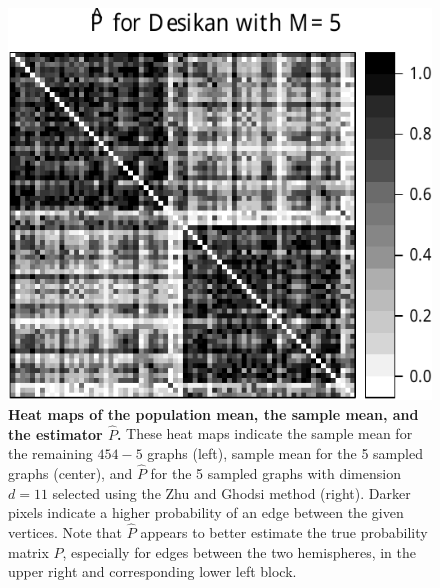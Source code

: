 \documentclass[10pt,letterpaper]{article}
\renewcommand{\hat}{\widehat}
\begin{document}
\begin{figure}[!htbp]
\includegraphics[height=.186\textheight]{Phat_desikan_m5.pdf}
\caption{{\bf Heat maps of the population mean, the sample mean, and the estimator $\hat{P}$.}
These heat maps indicate the sample mean for the remaining $454-5$ graphs (left), sample mean for the 5 sampled graphs (center), and $\hat{P}$ for the 5 sampled graphs with dimension $d=11$ selected using the Zhu and Ghodsi method (right).
Darker pixels indicate a higher probability of an edge between the given vertices.
Note that $\hat{P}$ appears to better estimate the true probability matrix $P$, especially for edges between the two hemispheres, in the upper right and corresponding lower left block.
}
\label{fig:Matrix_desikan_m5}
\end{figure}
\end{document}
